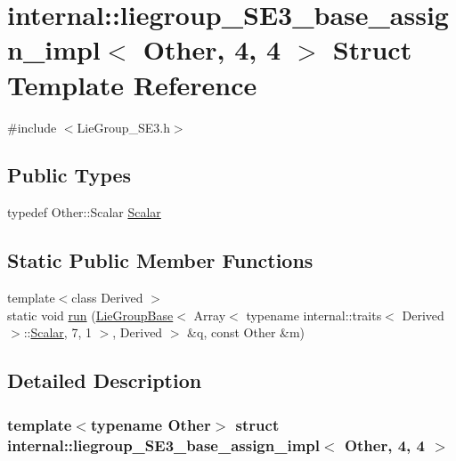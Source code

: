 \hypertarget{structinternal_1_1liegroup___s_e3__base__assign__impl_3_01_other_00_014_00_014_01_4}{}\section{internal\+:\+:liegroup\+\_\+\+S\+E3\+\_\+base\+\_\+assign\+\_\+impl$<$ Other, 4, 4 $>$ Struct Template Reference}
\label{structinternal_1_1liegroup___s_e3__base__assign__impl_3_01_other_00_014_00_014_01_4}


{\ttfamily \#include $<$Lie\+Group\+\_\+\+S\+E3.\+h$>$}

\subsection*{Public Types}
\begin{DoxyCompactItemize}
\item 
typedef Other\+::\+Scalar \hyperlink{structinternal_1_1liegroup___s_e3__base__assign__impl_3_01_other_00_014_00_014_01_4_a850deb96b6b52d92a8ae1e6d771b24be}{Scalar}
\end{DoxyCompactItemize}
\subsection*{Static Public Member Functions}
\begin{DoxyCompactItemize}
\item 
{\footnotesize template$<$class Derived $>$ }\\static void \hyperlink{structinternal_1_1liegroup___s_e3__base__assign__impl_3_01_other_00_014_00_014_01_4_a23f778b47ec9a8303bcb3ee52cc84c0f}{run} (\hyperlink{class_lie_group_base}{Lie\+Group\+Base}$<$ Array$<$ typename internal\+::traits$<$ Derived $>$\+::\hyperlink{structinternal_1_1liegroup___s_e3__base__assign__impl_3_01_other_00_014_00_014_01_4_a850deb96b6b52d92a8ae1e6d771b24be}{Scalar}, 7, 1 $>$, Derived $>$ \&q, const Other \&m)
\end{DoxyCompactItemize}


\subsection{Detailed Description}
\subsubsection*{template$<$typename Other$>$\newline
struct internal\+::liegroup\+\_\+\+S\+E3\+\_\+base\+\_\+assign\+\_\+impl$<$ Other, 4, 4 $>$}



